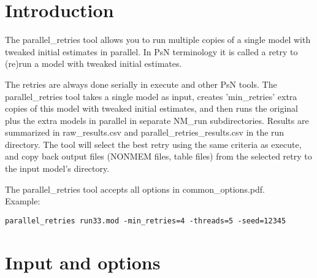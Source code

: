 

\usepackage{hyperref}



\maketitle
\newcommand{\guidetoolname}{parallel\_retries}
\tableofcontents
\newpage

\section{Introduction}
The parallel\_retries tool allows you to run multiple copies of a single model with tweaked initial estimates in parallel.
In PsN terminology it is called a retry to (re)run a model with tweaked initial estimates.

The retries are always done serially in execute and other PsN tools. The parallel\_retries tool takes a single model as input, creates 'min\_retries' extra copies of this model with tweaked initial estimates, and then runs the original plus the extra models in parallel in separate NM\_run subdirectories. Results are summarized in raw\_results.csv and parallel\_retries\_results.csv in the run directory. The tool will select the best retry using the same criteria as execute, and copy back output files (NONMEM files, table files) from the selected retry to the input model's directory.

The parallel\_retries tool accepts all options in common\_options.pdf.\\ 

Example:
\begin{verbatim}
parallel_retries run33.mod -min_retries=4 -threads=5 -seed=12345
\end{verbatim}

\section{Input and options}
